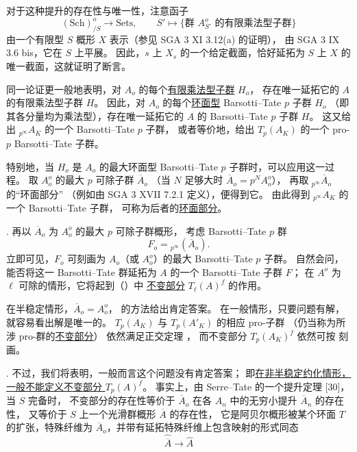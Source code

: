 对于这种提升的存在性与唯一性，注意函子
\[
 (\mathrm{Sch})^o_{/S}\longrightarrow\mathrm{Sets},
 \qquad
 S'\longmapsto
 \{\text{群 }A^o_{S'}\text{ 的有限乘法型子群}\}
\]
由一个有限型 $S$ 概形 $X$ 表示（参见 SGA 3 XI 3.12(a) 的证明），
由 SGA 3 IX 3.6 bis，它在 $S$ 上平展。
因此，$s$ 上 $X_s$ 的一个给定截面，恰好延拓为 $S$ 上 $X$ 的唯一截面，这就证明了断言。

同一论证更一般地表明，对 $A_o$ 的每个\underline{有限乘法型子群} $H_o$，
存在唯一延拓它的 $A$ 的有限乘法型子群 $H$。
因此，对 $A_o$ 的每个\underline{环面型} Barsotti--Tate $p$ 子群 $H_o$
（即其各分量均为乘法型），存在唯一延拓它的 $A$ 的 Barsotti--Tate $p$ 子群 $H$。
这又给出 ${}_{p^\infty}A_K$ 的一个 Barsotti--Tate $p$ 子群，
或者等价地，给出 $T_p(A_K)$ 的一个 pro-$p$ Barsotti--Tate 子群。

特别地，当 $H_o$ 是 $A_o$ 的最大环面型 Barsotti--Tate $p$ 子群时，可以应用这一过程。
取 $A_o^o$ 的最大 $p$ 可除子群 $\overline A_o$
（当 $N$ 足够大时 $\overline A_o=p^N A_o^o$），
再取 ${}_{p^\infty}\overline A_o$ 的“环面部分”
（例如由 SGA 3 XVII 7.2.1 定义），便得到它。
由此得到 ${}_{p^\infty}A_K$ 的一个 Barsotti--Tate 子群，
可称为后者的\underline{环面部分}。

\medskip
\noindent
{}. 再以 $\overline A_o$ 为 $A_o^o$ 的最大 $p$ 可除子群概形，
考虑 Barsotti--Tate $p$ 群
\[
 F_o={}_{p^\infty}(\overline A_o).
\]
立即可见，$F_o$ 可刻画为 $A_o$（或 $A_o^o$）的最大 Barsotti--Tate $p$ 子群。
自然会问，能否将这一 Barsotti--Tate 群延拓为 $A$ 的一个 Barsotti--Tate 子群 $F$；
在 $A^o$ 为 $\ell$ 可除的情形，它将起到（）中
\underline{不变部分} $T_\ell(A)^f$ 的作用。

在半稳定情形，$\overline A_o=A_o^o$， 的方法给出肯定答案。
在一般情形，只要问题有解，就容易看出解是唯一的。
$T_p(A_K)$ 与 $T_p(A'_K)$ 的相应 pro-子群
（仍当称为所涉 pro-群的\underline{不变部分}）
依然满足正交定理 ，
而不变部分 $T_p(A_K)^f$ 依然可按  刻画。

\medskip
\noindent
{}. 不过，我们将表明，一般而言这个问题没有肯定答案；
即\underline{在非半稳定约化情形，一般不能定义不变部分 $T_p(A)^f$}。
事实上，由 Serre--Tate 的一个提升定理 [30]，当 $S$ 完备时，
不变部分的存在性等价于 $\overline A_o$ 在各 $A_n$ 中的无穷小提升 $\overline A_n$ 的存在性，
又等价于 $S$ 上一个光滑群概形 $\overline A$ 的存在性，
它是阿贝尔概形被某个环面 $T$ 的扩张，特殊纤维为 $\overline A_o$，并带有延拓特殊纤维上包含映射的形式同态
\[
 \widehat{\overline A}\longrightarrow\widehat A
\]

